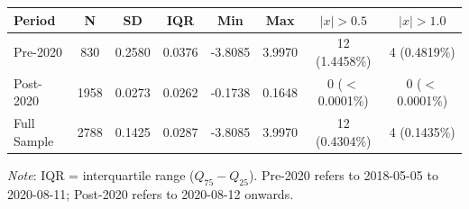 \begin{tabular}{lccccccc}
  \toprule
  \textbf{Period} & \textbf{N} & \textbf{SD} & \textbf{IQR} & \textbf{Min} & \textbf{Max} & \textbf{$|x|>0.5$} & \textbf{$|x|>1.0$} \\ 
  \midrule
  Pre-2020 & 830 & 0.2580 & 0.0376 & -3.8085 & 3.9970 & 12 (1.4458\%) & 4 (0.4819\%) \\ 
  Post-2020 & 1958 & 0.0273 & 0.0262 & -0.1738 & 0.1648 & 0 ($<$0.0001\%) & 0 ($<$0.0001\%) \\ 
  Full Sample & 2788 & 0.1425 & 0.0287 & -3.8085 & 3.9970 & 12 (0.4304\%) & 4 (0.1435\%) \\ 
  \bottomrule
\end{tabular}
\par\vspace{4pt}
\begin{minipage}{\linewidth}
  \footnotesize \textit{Note}: IQR = interquartile range ($Q_{75}-Q_{25}$). Pre-2020 refers to 2018-05-05 to 2020-08-11; Post-2020 refers to 2020-08-12 onwards.
\end{minipage}